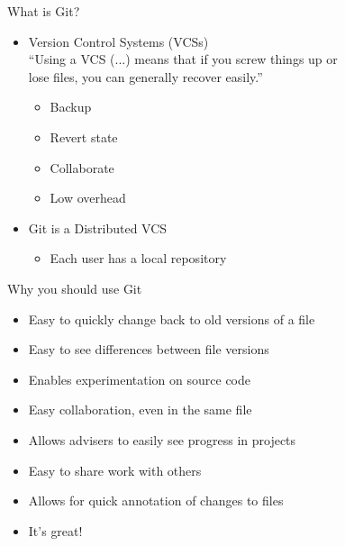 \documentclass[xcolor=dvipsnames]{beamer}
\begin{document}
\begin{frame}{What is Git?}

\vspace{-5mm}
\begin{itemize}
\item Version Control Systems (VCSs)\\
\hspace{4mm} ``Using a VCS (...) means that if you screw things up or\\\hspace{6mm}  lose files, you can generally recover easily.''
\begin{itemize}
\item Backup
\item Revert state
\item Collaborate
\item Low overhead
\end{itemize}

\item Git is a Distributed VCS
\begin{itemize}
\item Each user has a local repository
\end{itemize}
\end{itemize}

\end{frame}

\begin{frame}{Why you should use Git}
\begin{itemize}
\item Easy to quickly change back to old versions of a file
\item Easy to see differences between file versions
\item Enables experimentation on source code
\item Easy collaboration, even in the same file
\item Allows advisers to easily see progress in projects
\item Easy to share work with others
\item Allows for quick annotation of changes to files
\item It's {\LARGE great!}
\end{itemize}
\end{frame}
\end{document}
